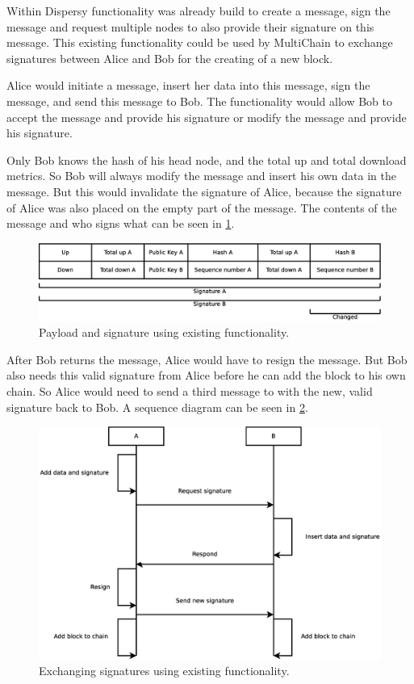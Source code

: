 Within Dispersy functionality was already build to create a message, sign the message
and request multiple nodes to also provide their signature on this message.
This existing functionality could be used by MultiChain to exchange signatures
between Alice and Bob for the creating of a new block.

Alice would initiate a message, insert her data into this message, sign the message, and send this message to Bob.
The functionality would allow Bob to accept the message and provide his signature or
modify the message and provide his signature.

Only Bob knows the hash of his head node, and the total up and total download metrics.
So Bob will always modify the message and insert his own data in the message.
But this would invalidate the signature of Alice,
because the signature of Alice was also placed on the empty part of the message.
The contents of the message and who signs what can be seen in \ref{fig:payload-signature-old}.

\begin{figure}
	\centerline{\includegraphics[scale=0.3]{design/figs/signature_old.eps}}
	\caption{Payload and signature using existing functionality.}
	\label{fig:payload-signature-old}
\end{figure}


After Bob returns the message,
Alice would have to resign the message.
But Bob also needs this valid signature from Alice before he can add the block to his own chain.
So Alice would need to send a third message to with the new, valid signature back to Bob.
A sequence diagram can be seen in \ref{fig:exchange-old-sequence}.

\begin{figure}
	\centerline{\includegraphics[scale=0.3]{design/figs/exchange_old.eps}}
	\caption{Exchanging signatures using existing functionality.}
	\label{fig:exchange-old-sequence}
\end{figure}


